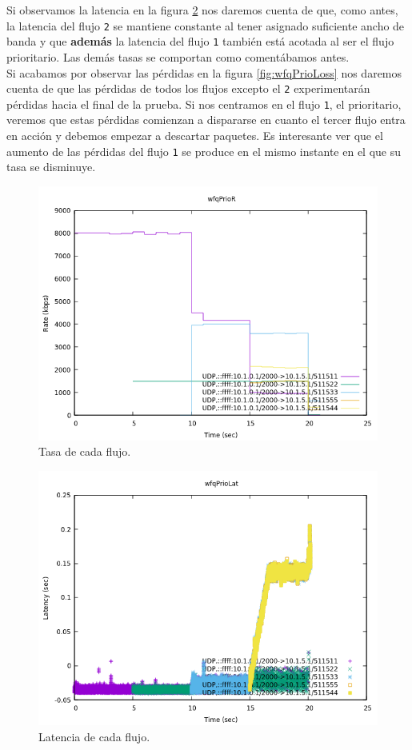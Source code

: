 \documentclass[11pt]{article}
\begin{document}
            Si observamos la latencia en la figura \ref{fig:wfqPrioLat} nos daremos cuenta de que, como antes, la latencia del flujo \texttt{2} se mantiene constante al tener asignado suficiente ancho de banda y que \textbf{además} la latencia del flujo \texttt{1} también está acotada al ser el flujo prioritario. Las demás tasas se comportan como comentábamos antes.\\

            Si acabamos por observar las pérdidas en la figura \ref{fig:wfqPrioLoss} nos daremos cuenta de que las pérdidas de todos los flujos excepto el \texttt{2} experimentarán pérdidas hacia el final de la prueba. Si nos centramos en el flujo \texttt{1}, el prioritario, veremos que estas pérdidas comienzan a dispararse en cuanto el tercer flujo entra en acción y debemos empezar a descartar paquetes. Es interesante ver que el aumento de las pérdidas del flujo \texttt{1} se produce en el mismo instante en el que su tasa se disminuye.

            \begin{figure}
                \centering
                \includegraphics[width=0.6\linewidth]{wfqPrioR.png}
                \caption{Tasa de cada flujo.}
                \label{fig:wfqPrioR}
            \end{figure}

            \begin{figure}
                \centering
                \includegraphics[width=0.6\linewidth]{wfqPrioLat.png}
                \caption{Latencia de cada flujo.}
                \label{fig:wfqPrioLat}
            \end{figure}
\end{document}

